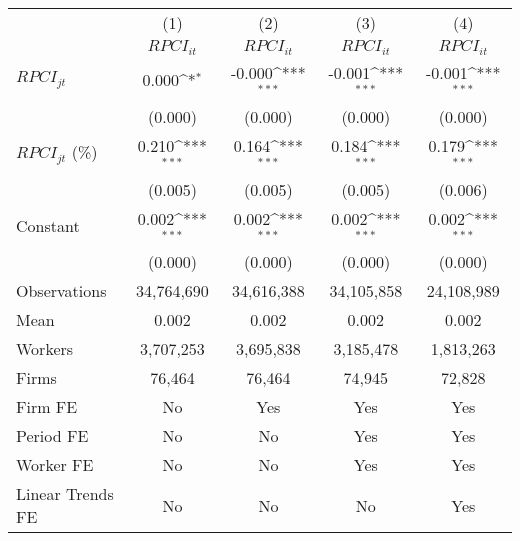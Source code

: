 {
\def\sym#1{\ifmmode^{#1}\else\(^{#1}\)\fi}
\begin{tabular}{l*{4}{c}}
\hline\hline
                    &\multicolumn{1}{c}{(1)}&\multicolumn{1}{c}{(2)}&\multicolumn{1}{c}{(3)}&\multicolumn{1}{c}{(4)}\\
                    &\multicolumn{1}{c}{$RPCI_{it}$}&\multicolumn{1}{c}{$RPCI_{it}$}&\multicolumn{1}{c}{$RPCI_{it}$}&\multicolumn{1}{c}{$RPCI_{it}$}\\
\hline
$RPCI_{jt}$         &       0.000\sym{*}  &      -0.000\sym{***}&      -0.001\sym{***}&      -0.001\sym{***}\\
                    &     (0.000)         &     (0.000)         &     (0.000)         &     (0.000)         \\
[1em]
$RPCI_{jt}$ (\%)    &       0.210\sym{***}&       0.164\sym{***}&       0.184\sym{***}&       0.179\sym{***}\\
                    &     (0.005)         &     (0.005)         &     (0.005)         &     (0.006)         \\
[1em]
Constant            &       0.002\sym{***}&       0.002\sym{***}&       0.002\sym{***}&       0.002\sym{***}\\
                    &     (0.000)         &     (0.000)         &     (0.000)         &     (0.000)         \\
\hline
Observations        &  34,764,690         &  34,616,388         &  34,105,858         &  24,108,989         \\
Mean                &       0.002         &       0.002         &       0.002         &       0.002         \\
Workers             &   3,707,253         &   3,695,838         &   3,185,478         &   1,813,263         \\
Firms               &      76,464         &      76,464         &      74,945         &      72,828         \\
Firm FE             &          No         &         Yes         &         Yes         &         Yes         \\
Period FE           &          No         &          No         &         Yes         &         Yes         \\
Worker FE           &          No         &          No         &         Yes         &         Yes         \\
Linear Trends FE    &          No         &          No         &          No         &         Yes         \\
\hline\hline
\end{tabular}
}

